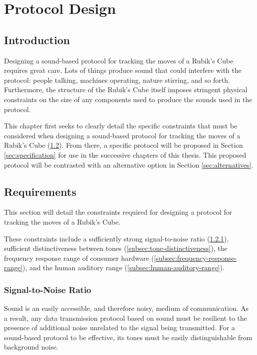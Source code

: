 
\chapter{Protocol Design} %

\label{Chapter4} %

\section{Introduction}
Designing a sound-based protocol for tracking the moves of a Rubik's Cube requires great care.
Lots of things produce sound that could interfere with the protocol: people talking, machines operating, nature stirring, and so forth.
Furthermore, the structure of the Rubik's Cube itself imposes stringent physical constraints on the size of any components used to produce the sounds used in the protocol.

This chapter first seeks to clearly detail the specific constraints that must be considered when designing a sound-based protocol for tracking the moves of a Rubik's Cube (\ref{sec:requirements}).
From there, a specific protocol will be proposed in Section \ref{sec:specification} for use in the successive chapters of this thesis.
This proposed protocol will be contrasted with an alternative option in Section \ref{sec:alternatives}.


\section{Requirements}
\label{sec:requirements}
This section will detail the constraints required for designing a protocol for tracking the moves of a Rubik's Cube.

These constraints include a sufficiently strong signal-to-noise ratio (\ref{subsec:signal-to-noise-ratio}), sufficient distinctiveness between tones (\ref{subsec:tone-distinctiveness}), the frequency response range of consumer hardware (\ref{subsec:frequency-response-range}), and the human auditory range (\ref{subsec:human-auditory-range}).

\subsection{Signal-to-Noise Ratio}
\label{subsec:signal-to-noise-ratio}
Sound is an easily accessible, and therefore noisy, medium of communication.
As a result, any data transmission protocol based on sound must be resilient to the presence of additional noise unrelated to the signal being transmitted.
For a sound-based protocol to be effective, its tones must be easily distinguishable from background noise.

